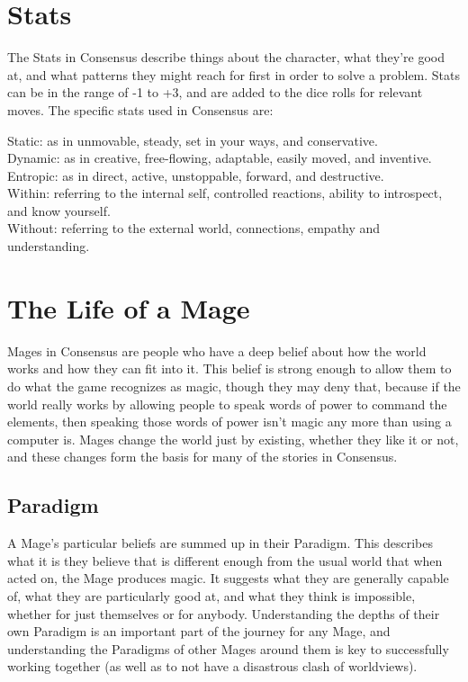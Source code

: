 \documentclass[
  oneside,
  statementpaper,
  9pt]{memoir}
\begin{document}
\hypertarget{stats}{%
\section{Stats}\label{stats}}

The Stats in Consensus describe things about the character, what they're
good at, and what patterns they might reach for first in order to solve
a problem. Stats can be in the range of -1 to +3, and are added to the
dice rolls for relevant moves. The specific stats used in Consensus are:

Static: as in unmovable, steady, set in your ways, and conservative.\\
Dynamic: as in creative, free-flowing, adaptable, easily moved, and
inventive.\\
Entropic: as in direct, active, unstoppable, forward, and destructive.\\
Within: referring to the internal self, controlled reactions, ability to
introspect, and know yourself.\\
Without: referring to the external world, connections, empathy and
understanding.

\hypertarget{the-life-of-a-mage}{%
\section{The Life of a Mage}\label{the-life-of-a-mage}}

Mages in Consensus are people who have a deep belief about how the world
works and how they can fit into it. This belief is strong enough to
allow them to do what the game recognizes as magic, though they may deny
that, because if the world really works by allowing people to speak
words of power to command the elements, then speaking those words of
power isn't magic any more than using a computer is. Mages change the
world just by existing, whether they like it or not, and these changes
form the basis for many of the stories in Consensus.

\hypertarget{paradigm}{%
\subsection{Paradigm}\label{paradigm}}

A Mage's particular beliefs are summed up in their Paradigm. This
describes what it is they believe that is different enough from the
usual world that when acted on, the Mage produces magic. It suggests
what they are generally capable of, what they are particularly good at,
and what they think is impossible, whether for just themselves or for
anybody. Understanding the depths of their own Paradigm is an important
part of the journey for any Mage, and understanding the Paradigms of
other Mages around them is key to successfully working together (as well
as to not have a disastrous clash of worldviews).
\end{document}
